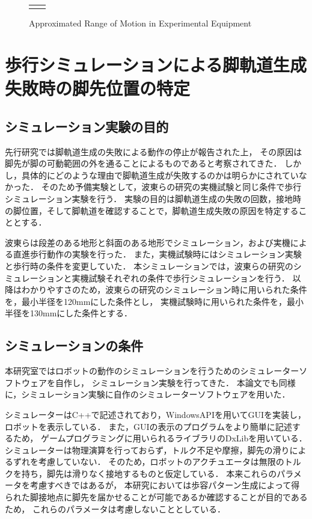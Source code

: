 \begin{figure}[h]
\begin{tabular}{cc}
\begin{minipage}{0.45\textwidth}
          \caption{Approximated \newline Range of Motion in Experimental Equipment}
          \label{fig:act_leg_range} %
      \end{minipage}
  \end{tabular}
\end{figure}

\section{歩行シミュレーションによる脚軌道生成失敗時の脚先位置の特定}

\subsection{シミュレーション実験の目的}
先行研究では脚軌道生成の失敗による動作の停止が報告された上，
その原因は脚先が脚の可動範囲の外を通ることによるものであると考察されてきた．
しかし，具体的にどのような理由で脚軌道生成が失敗するのかは明らかにされていなかった．
そのため予備実験として，波東らの研究\cite{Hato_Graph_search}の実機試験と同じ条件で歩行シミュレーション実験を行う．
実験の目的は脚軌道生成の失敗の回数，接地時の脚位置，そして脚軌道を確認することで，脚軌道生成失敗の原因を特定することとする．

波東らは段差のある地形と斜面のある地形でシミュレーション，および実機による直進歩行動作の実験を行った．
また，実機試験時にはシミュレーション実験と歩行時の条件を変更していた．
本シミュレーションでは，波東らの研究のシミュレーションと実機試験それぞれの条件で歩行シミュレーションを行う．
以降はわかりやすさのため，波東らの研究のシミュレーション時に用いられた条件を，最小半径を120mmにした条件とし，
実機試験時に用いられた条件を，最小半径を130mmにした条件とする．

\subsection{シミュレーションの条件}
本研究室ではロボットの動作のシミュレーションを行うためのシミュレーターソフトウェアを自作し，
シミュレーション実験を行ってきた．
本論文でも同様に，シミュレーション実験に自作のシミュレーターソフトウェアを用いた．

シミュレーターはC++で記述されており，WindowsAPIを用いてGUIを実装し，ロボットを表示している．
また，GUIの表示のプログラムをより簡単に記述するため，
ゲームプログラミングに用いられるライブラリのDxLib\cite{Dxlib_Web}を用いている．
シミュレーターは物理演算を行っておらず，トルク不足や摩擦，脚先の滑りによるずれを考慮していない．
そのため，ロボットのアクチュエータは無限のトルクを持ち，脚先は滑りなく接地するものと仮定している．
本来これらのパラメータを考慮すべきではあるが，
本研究においては歩容パターン生成によって得られた脚接地点に脚先を届かせることが可能であるか確認することが目的であるため，
これらのパラメータは考慮しないこととしている．

